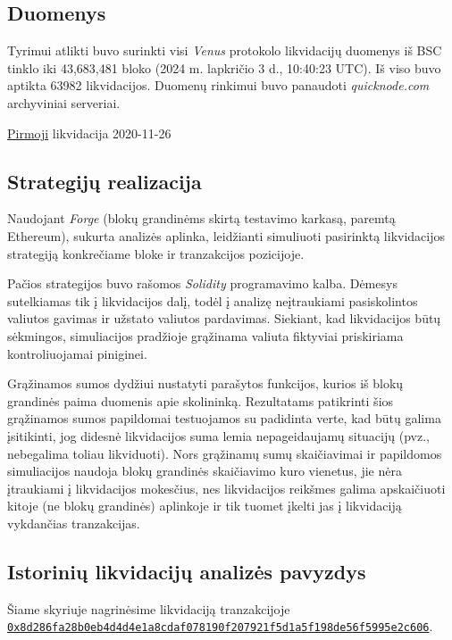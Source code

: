 \documentclass[]{VUMIFTemplateClass}
\begin{document}
\subsection{Duomenys}

Tyrimui atlikti buvo surinkti visi \textit{Venus} protokolo likvidacijų duomenys iš BSC tinklo iki 43,683,481 bloko (2024 m. lapkričio 3 d., 10:40:23 UTC). Iš viso buvo aptikta 63982 likvidacijos. Duomenų rinkimui buvo panaudoti \textit{quicknode.com} archyviniai serveriai.

\href{https://bscscan.com/tx/0x2434f5aee00e1135c66fb42203d506351ed2b6629e01af5daee37f652e4d67b8}{Pirmoji}
likvidacija 2020-11-26

\subsection{Strategijų realizacija}

Naudojant \textit{Forge} (blokų grandinėms skirtą testavimo karkasą, paremtą Ethereum), sukurta analizės aplinka, leidžianti simuliuoti pasirinktą likvidacijos strategiją konkrečiame bloke ir tranzakcijos pozicijoje.

Pačios strategijos buvo rašomos \textit{Solidity} programavimo kalba. Dėmesys sutelkiamas tik į likvidacijos dalį, todėl į analizę neįtraukiami pasiskolintos valiutos gavimas ir užstato valiutos pardavimas. Siekiant, kad likvidacijos būtų sėkmingos, simuliacijos pradžioje grąžinama valiuta fiktyviai priskiriama kontroliuojamai piniginei.

Grąžinamos sumos dydžiui nustatyti parašytos funkcijos, kurios iš blokų grandinės paima duomenis apie skolininką. Rezultatams patikrinti šios grąžinamos sumos papildomai testuojamos su padidinta verte, kad būtų galima įsitikinti, jog didesnė likvidacijos suma lemia nepageidaujamų situacijų (pvz., nebegalima toliau likviduoti). Nors grąžinamų sumų skaičiavimai ir papildomos simuliacijos naudoja blokų grandinės skaičiavimo kuro vienetus, jie nėra įtraukiami į likvidacijos mokesčius, nes likvidacijos reikšmes galima apskaičiuoti kitoje (ne blokų grandinės)  aplinkoje ir tik tuomet įkelti jas į likvidaciją vykdančias tranzakcijas.

\subsection{Istorinių likvidacijų analizės pavyzdys}

\small
Šiame skyriuje nagrinėsime likvidaciją tranzakcijoje \\\href{https://app.blocksec.com/explorer/tx/bsc/0x8d286fa28b0eb4d4d4e1a8cdaf078190f207921f5d1a5f198de56f5995e2c606}{\texttt{0x8d286fa28b0eb4d4d4e1a8cdaf078190f207921f5d1a5f198de56f5995e2c606}}.
\end{document}
